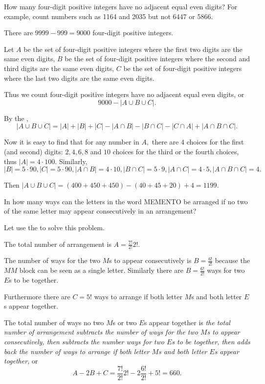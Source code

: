 \documentclass{article}
\begin{document}
\begin{example}
    How many four-digit positive integers have no adjacent equal even digits? For example, count numbers such as 1164 and 2035 but not 6447 or 5866.
\end{example}

\begin{soln}
    There are $9999 - 999 = 9000$ four-digit positive integers.
    
    Let $A$ be the set of four-digit positive integers where the first two digits are the same even digits,
    $B$ be the set of four-digit positive integers where the second and third digits are the same even digits,
    $C$ be the set of four-digit positive integers where the last two digits are the same even digits.

    Thus we count four-digit positive integers have no adjacent equal even digits, or
    \[
        9000 - |A \cup B \cup C|.
    \]

    By the , 
    \[
        |A \cup B \cup C| = |A| + |B| + |C| - |A \cap B| - |B \cap C| - |C \cap A|+ |A \cap B \cap C|.
    \]

    Now it is easy to find that for any number in $A,$ there are 4 choices for the first (and second) digits: $2,4,6,8$
    and $10$ choices for the third or the fourth choices, thus $|A| = 4 \cdot 100.$ Similarly,
    \[
        |B| = 5 \cdot 90, |C| = 5 \cdot 90, 
        |A \cap B| = 4 \cdot 10, |B \cap C| = 5 \cdot 9, |A \cap C| = 4\cdot 5, |A \cap B \cap C| = 4.
    \]

    Then $|A \cup B \cup C| = (400+450+450)-(40+45+20)+4 = \boxed{1199.}$
\end{soln}

\begin{example}
    In how many ways can the letters in the word MEMENTO be arranged
    if no two of the same letter may appear consecutively in an arrangement?
\end{example}

\begin{soln}
    Let use the  to solve this problem.

    The total number of arrangement is $A=\frac{7!}{2!}{2!}.$

    The number of ways for the two $M$s to appear consecutively is $B=\frac{6!}{2!}$ because the $MM$ block can be seen as a single letter. 
    Similarly there are $B=\frac{6!}{2!}$ ways for two $E$s to be together. 
    
    Furthermore there are $C=5!$ ways to arrange if both letter $M$s and  both letter $E$s appear together.

    The total number of ways no two $M$s or two $E$s appear together is \textit{the total number of arrangement
    subtracts the number of ways for the two $M$s to appear consecutively, then subtracts the number ways for two $E$s to be together,
    then adds back the number of ways to arrange if both letter $M$s and  both letter $E$s appear together,} or
    \[
        A-2B+C=\frac{7!}{2!}{2!}-2\frac{6!}{2!}+5!=\boxed{660.}
    \]
\end{soln}
\end{document}
